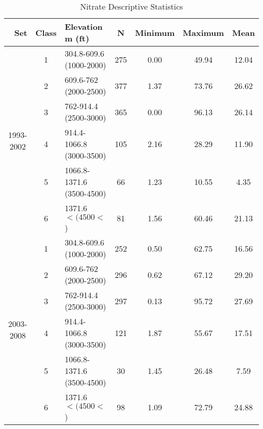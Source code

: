\begin{table}[htbp]
  \centering
	\caption{Nitrate Descriptive Statistics}
    \begin{tabular}{rrlcccc}
    \toprule
    Set   & Class & Elevation m (ft) & N     & Minimum & Maximum & Mean \\
    \midrule
    \multicolumn{1}{c}{\multirow{6}[2]{*}{\begin{sideways}1993-2002\end{sideways}}} & \multicolumn{1}{c}{1} & \multicolumn{1}{l}{304.8-609.6 (1000-2000)} & 275   & 0.00  & 49.94  & 12.04  \\
    \multicolumn{1}{c}{} & \multicolumn{1}{c}{2} & \multicolumn{1}{l}{609.6-762 (2000-2500)} & 377   & 1.37  & 73.76  & 26.62  \\
    \multicolumn{1}{c}{} & \multicolumn{1}{c}{3} & \multicolumn{1}{l}{762-914.4 (2500-3000)} & 365   & 0.00  & 96.13  & 26.14  \\
    \multicolumn{1}{c}{} & \multicolumn{1}{c}{4} & \multicolumn{1}{l}{914.4-1066.8 (3000-3500)} & 105   & 2.16  & 28.29  & 11.90  \\
    \multicolumn{1}{c}{} & \multicolumn{1}{c}{5} & \multicolumn{1}{l}{1066.8-1371.6 (3500-4500)} & 66    & 1.23  & 10.55  & 4.35  \\
    \multicolumn{1}{c}{} & \multicolumn{1}{c}{6} & \multicolumn{1}{l}{1371.6$< (4500<$)} & 81    & 1.56  & 60.46  & 21.13  \\\midrule
    \multicolumn{1}{c}{\multirow{6}[2]{*}{\begin{sideways}2003-2008\end{sideways}}} & \multicolumn{1}{c}{1} & \multicolumn{1}{l}{304.8-609.6 (1000-2000)} & 252   & 0.50  & 62.75  & 16.56  \\
    \multicolumn{1}{c}{} & \multicolumn{1}{c}{2} & \multicolumn{1}{l}{609.6-762 (2000-2500)} & 296   & 0.62  & 67.12  & 29.20  \\
    \multicolumn{1}{c}{} & \multicolumn{1}{c}{3} & \multicolumn{1}{l}{762-914.4 (2500-3000)} & 297   & 0.13  & 95.72  & 27.69  \\
    \multicolumn{1}{c}{} & \multicolumn{1}{c}{4} & \multicolumn{1}{l}{914.4-1066.8 (3000-3500)} & 121   & 1.87  & 55.67  & 17.51  \\
    \multicolumn{1}{c}{} & \multicolumn{1}{c}{5} & \multicolumn{1}{l}{1066.8-1371.6 (3500-4500)} & 30    & 1.45  & 26.48  & 7.59  \\
    \multicolumn{1}{c}{} & \multicolumn{1}{c}{6} & \multicolumn{1}{l}{1371.6$< (4500<$)} & 98    & 1.09  & 72.79  & 24.88  \\\midrule

\end{tabular}
\end{table}
